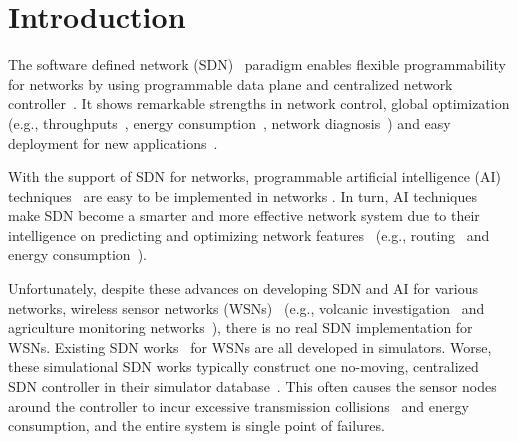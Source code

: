 \section{Introduction}


The software defined network (SDN)~\cite{Benzekki2016Software,Sezer2013Are} paradigm
enables flexible programmability for networks 
by using programmable data plane and centralized network controller~\cite{7122247}.
It shows remarkable strengths in network control, global optimization 
(e.g., throughputs~\cite{Alicherry2005Joint}, energy consumption~\cite{Miao2010Cross}, network diagnosis~\cite{gong2015directional})
and easy deployment for new applications~\cite{Feamster2014The}.

With the support of SDN for networks, programmable artificial intelligence (AI) 
techniques~\cite{Norvig1995Artificial, Poole2010Artificial, Cockburn1996ARCHON} 
are easy to be implemented in networks \cite{mahmud2011exploitation}.
In turn, AI techniques make SDN become a smarter and more effective network system
due to their intelligence on predicting and optimizing network features~\cite{mahmud2011exploitation}
(e.g., routing~\cite{Alicherry2005Joint} and energy consumption~\cite{Miao2010Cross}).
 
 

Unfortunately, despite these advances on developing SDN and AI %
for various networks, wireless sensor networks (WSNs)~\cite{Potdar2009Wireless}
(e.g., volcanic investigation~\cite{Wernerallen2006Deploying}
and agriculture monitoring networks~\cite{Wang2010L3SN}),
there is no real SDN implementation for WSNs. 
Existing SDN works~\cite{mahmud2011exploitation, costanzo2012software, luo2012sensor, de2015tinysdn, galluccio2015sdn} 
for WSNs are all developed in simulators.
Worse, these simulational SDN works typically construct one no-moving, centralized SDN controller 
in their simulator database~\cite{Potdar2009Wireless}. 
This often causes the sensor nodes around the  controller to incur 
excessive transmission collisions~\cite{Yang2014,Mizuyama2017Estimation} 
and energy consumption, and 
the entire system is single point of failures.



